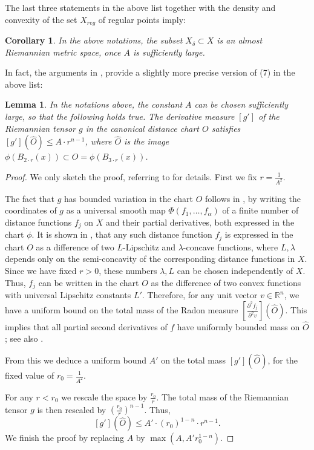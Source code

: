 \documentclass[12pt,leqno,intlimits]{amsart}
\numberwithin{equation}{section}
\newtheorem{lem}[thm]{Lemma}
\newtheorem{cor}[thm]{Corollary}
\theoremstyle{definition}
\theoremstyle{remark}
\newcommand{\R}{\mathbb{R}}
\begin{document}
The last three statements in the above list together with the density and convexity of the set $X_{reg}$ of regular points imply:
\begin{cor}
In the above notations, the subset $X_{\delta} \subset X$ is an almost Riemannian metric space, once $A$ is sufficiently large.
\end{cor}

In fact, the arguments in \cite[4.2]{Per-DC}, provide a slightly more precise version of (7) in the above list:

\begin{lem} \label{lem:A}
In the notations above, the constant $A$ can be chosen sufficiently large, so that the following holds true.
The derivative measure $[g']$ of the Riemannian tensor $g$
in the canonical distance chart $O$ satisfies $[g'] (\hat O) \leq A \cdot r^{n-1} $, where $\hat O$ is the image $\phi (B_{2{\cdot}r} (x)) \subset O=
\phi (B_{3{\cdot}r} (x))$.
\end{lem}

\begin{proof}
We only sketch the proof, referring to \cite{Per-DC} for details.
First we fix $r=\frac 1 {A^2}$.

The fact that $g$ has bounded variation in the chart $O$ follows in \cite[Section 4.2]{Per-DC}, by writing the coordinates of $g$
as a universal smooth map $\Phi (f_1,\dots,f_{\alpha})$ of a finite number of distance functions $f_j$ on $X$ and their partial derivatives, both expressed in the chart $\phi$.
It is shown in \cite[Section 3]{Per-DC}, that any such distance function $f_j$ is expressed in the chart $O$ as a difference of two $L$-Lipschitz and $\lambda$-concave functions, where $L,\lambda$ depends only on the semi-concavity of the corresponding distance functions in $X$. Since we have fixed $r>0$, these numbers $\lambda,L$ can be chosen independently of $X$.
Thus, $f_j$ can be written in the chart $O$ as the difference of two convex functions with universal Lipschitz constants $L'$.
Therefore, for any unit vector $v\in \R^n$, we have a uniform bound on the total mass of the
Radon measure $[\frac {\partial ^2 f_j} {\partial ^2v}] (\hat O)$.
This implies that all partial second derivatives of $f$ have uniformly bounded mass on $\hat O$; see also \cite[Theorem 6.8]{Evans}.

From this we deduce a uniform bound $A'$ on the total mass $[g'] (\hat O)$, for the fixed value of $r_0=\frac 1 {A^2}$.

For any $r<r_0$ we rescale the space by $\frac {r_0} r$. The total mass of the Riemannian tensor $g$ is then rescaled
by $(\frac {r_0} r)^{n-1}$. Thus, $$[g'] (\hat O) \leq A'\cdot (r_0 ) ^{1-n} \cdot r^{n-1}  .$$
We finish the proof by replacing $A$ by $\max(A, A' r_0^{1-n})$.
\end{proof}
\end{document}
